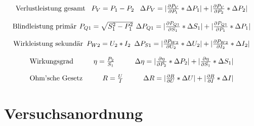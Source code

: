 \documentclass[12pt,a4paper,twoside]{article}
\begin{document}
\begin{equation}
    \label{eq:Verlustleistung}
    \centerline{Verlustleistung gesamt \\ $P_{V} = P_{1} - P_{2}$ \\ $\Delta P_{V} = \vert \frac{\partial P_{V}}{\partial P_{1}} * \Delta P_{1} \vert + \vert \frac{\partial P_{V}}{\partial P_{2}} * \Delta P_{2} \vert $}
\end{equation}

\begin{equation}
    \label{eq:Blindleistung}
    \centerline{Blindleistung primär \\ $P_{Q1} = \sqrt{S_{1}^2 - P_{1}^2}$ \\ $\Delta P_{Q1} = \vert \frac{\partial P_{Q1}}{\partial S_{1}} * \Delta S_{1} \vert + \vert \frac{\partial P_{Q1}}{\partial P_{1}} * \Delta P_{1} \vert $}
\end{equation}

\begin{equation}
    \label{eq:Wirkleistung}
    \centerline{Wirkleistung sekundär \\ $P_{W2} = U_{2}*I_{2}$ \\ $\Delta P_{S1} = \vert \frac{\partial P_{W2}}{\partial U_{2}} * \Delta U_{2} \vert + \vert \frac{\partial P_{W2}}{\partial I_{2}} * \Delta I_{2} \vert $}
\end{equation}

\begin{equation}
    \label{eq:Wirkungsgrad}
    \centerline{Wirkungsgrad \\ $\eta = \frac{P_{2}}{S_{1}}$ \\ $\Delta \eta = \vert \frac{\partial \eta}{\partial P_{2}} * \Delta P_{2} \vert + \vert \frac{\partial \eta}{\partial S_{1}} * \Delta S_{1} \vert $}
\end{equation}

\begin{equation}
    \label{eq:OhmschesGesetz}
    \centerline{Ohm'sche Gesetz \\ $R = \frac{U}{I}$ \\ $\Delta R = \vert \frac{\partial R}{\partial U} * \Delta U \vert + \vert \frac{\partial R}{\partial I} * \Delta I \vert $}
\end{equation}


\section{Versuchsanordnung} %
\end{document}
